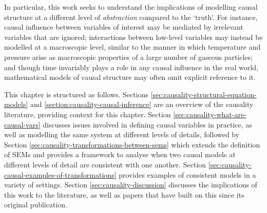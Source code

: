 In particular, this work seeks to understand the implications of modelling causal structure at a different level of \emph{abstraction} compared to the `truth'. For instance, causal influence between variables of interest may be mediated by irrelevant variables that are ignored; interactions between low-level variables may instead be modelled at a macroscopic level, similar to the manner in which temperature and pressure arise as macroscopic properties of a large number of gaseous particles; and though time invariably plays a role in any causal influence in the real world, mathematical models of causal structure may often omit explicit reference to it.

This chapter is structured as follows.
Sections \ref{sec:causality-structural-equation-models} and \ref{section:causality-causal-inference} are an overview of the causality literature, providing context for this chapter.
Section \ref{sec:causality-what-are-causal-vars} discusses issues involved in defining causal variables in practice, as well as modelling the same system at different levels of details,
followed by Section \ref{sec:causality-transformations-between-sems} which extends the definition of SEMs and provides a framework to analyse when two causal models at different levels of detail are consistent with one another.
Section \ref{sec:causality-causal-examples-of-transformations} provides examples of consistent models in a variety of settings.
Section \ref{sec:causality-discussion} discusses the implications of this work to the literature, as well as papers that have built on this since its original publication. 







